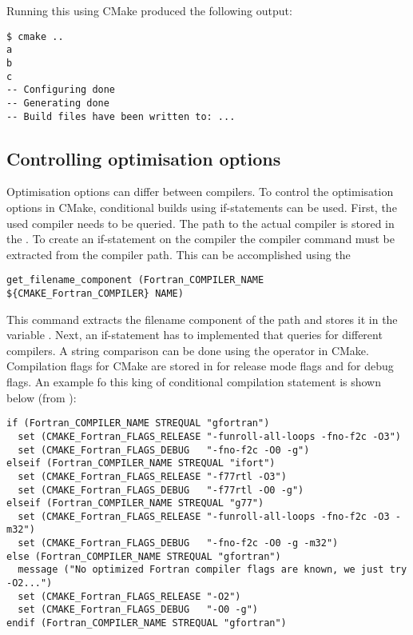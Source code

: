 Running this using CMake produced the following output:

\cmdmode

\begin{lstlisting}
$ cmake ..
a
b
c
-- Configuring done
-- Generating done
-- Build files have been written to: ...
\end{lstlisting}

\subsection{Controlling optimisation options}

Optimisation options can differ between compilers. To control the optimisation options in CMake, conditional builds using if-statements can be used. First, the used compiler needs to be queried. The path to the actual compiler is stored in the . To create an if-statement on the compiler the compiler command must be extracted from the compiler path. This can be accomplished using the 

\cmmode

\begin{lstlisting}
get_filename_component (Fortran_COMPILER_NAME ${CMAKE_Fortran_COMPILER} NAME)
\end{lstlisting}

This command extracts the filename component of the path and stores it in the variable . Next, an if-statement has to implemented that queries for different compilers. A string comparison can be done using the  operator in CMake. Compilation flags for CMake are stored in  for release mode flags and  for debug flags. An example fo this king of conditional compilation statement is shown below (from \cite{cmakecond12}):

\cmmode

\begin{lstlisting}
if (Fortran_COMPILER_NAME STREQUAL "gfortran")
  set (CMAKE_Fortran_FLAGS_RELEASE "-funroll-all-loops -fno-f2c -O3")
  set (CMAKE_Fortran_FLAGS_DEBUG   "-fno-f2c -O0 -g")
elseif (Fortran_COMPILER_NAME STREQUAL "ifort")
  set (CMAKE_Fortran_FLAGS_RELEASE "-f77rtl -O3")
  set (CMAKE_Fortran_FLAGS_DEBUG   "-f77rtl -O0 -g")
elseif (Fortran_COMPILER_NAME STREQUAL "g77")
  set (CMAKE_Fortran_FLAGS_RELEASE "-funroll-all-loops -fno-f2c -O3 -m32")
  set (CMAKE_Fortran_FLAGS_DEBUG   "-fno-f2c -O0 -g -m32")
else (Fortran_COMPILER_NAME STREQUAL "gfortran")
  message ("No optimized Fortran compiler flags are known, we just try -O2...")
  set (CMAKE_Fortran_FLAGS_RELEASE "-O2")
  set (CMAKE_Fortran_FLAGS_DEBUG   "-O0 -g")
endif (Fortran_COMPILER_NAME STREQUAL "gfortran")
\end{lstlisting}
 
